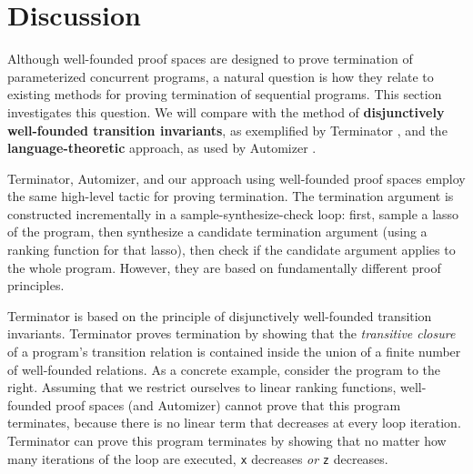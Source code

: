 \documentclass[9pt,nocopyrightspace]{sigplanconf}
\theoremstyle{definition}
\begin{document}
\section{Discussion} \label{sec:discussion}

Although well-founded proof spaces are designed to prove termination of
parameterized concurrent programs, a natural question is how they relate to
existing methods for proving termination of sequential programs.  This section
investigates this question.  We will compare with the method of
\textbf{disjunctively well-founded transition invariants}, as exemplified by
Terminator \cite{Cook2005}, and the \textbf{language-theoretic} approach, as
used by Automizer \cite{conf/cav/HeizmannHP14}.



Terminator, Automizer, and our approach using well-founded proof spaces employ
the same high-level tactic for proving termination. The termination argument
is constructed incrementally in a sample-synthesize-check loop: first, sample
a lasso of the program, then synthesize a candidate termination argument
(using a ranking function for that lasso), then check if the candidate
argument applies to the whole program.  However, they are based on
fundamentally different proof principles.

 Terminator is based on the principle of disjunctively well-founded
transition invariants.  Terminator proves termination by showing that the
\emph{transitive closure} of a program's transition relation is contained
inside the union of a finite number of well-founded relations.  As a concrete
example, consider the program to the right.  Assuming that we restrict
ourselves to linear ranking functions, well-founded proof spaces (and
Automizer) cannot prove that this program terminates, because there is no
linear term that decreases at every loop iteration.  Terminator can prove this
program terminates by showing that no matter how many iterations of the loop are
executed, \texttt{x} decreases \emph{or} \texttt{z} decreases.
\end{document}
